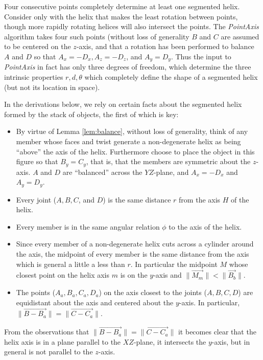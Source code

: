 \documentclass[11pt]{article}
\begin{document}
{Four consecutive points completely determine at least one segmented helix.
Consider
only with the helix that makes the least rotation between points,
though more rapidly rotating helices will also intersect the points.
The {\em PointAxis} algorithm
takes four such points (without loss of generality $B$ and $C$
are assumed to be centered on the $z$-axis, and that a
rotation has been performed to balance $A$ and $D$ so that $A_x = -D_x, A_z = -D_z$, and $A_y = D_y$. Thus the input to
{\em PointAxis} in fact has only three degrees of freedom, which determine the three intrinsic properties $r,d,\theta$
which completely define the shape of a segmented helix (but not its location in space).


In the derivations below, we rely on certain facts about
the segmented helix formed by the stack of objects, the first
of which is key:
\begin{itemize}
\item By virtue of Lemma \ref{lem:balance}, without loss of generality, think of any member whose faces
  and twist generate a non-degenerate helix as being ``above'' the
  axis of the helix. Furthermore choose to place the object in
  this figure so that $B_y = C_y$, that is, that the members are symmetric
  about the $z$-axis.
  $A$ and $D$ are ``balanced'' across the $YZ$-plane,
  and $A_x = -D_x$ and $A_y = D_y$.
\item Every joint ($A,B,C$, and $D$) is the same distance $r$ from the axis $H$ of the helix.
\item Every member is in the same angular relation $\phi$ to the axis of the helix.
\item Since every member of a non-degenerate helix cuts across a cylinder around the axis,
  the midpoint of every member is the same distance from the axis
  which is general a little a less than $r$. In particular the midpoint $M$
  whose closest point on the helix axis $m$ is on the $y$-axis and
  $\| \overrightarrow{M_m} \| < \| \overrightarrow{B_b} \|$.
\item The points ($A_a,B_a,C_a,D_a$) on the axis closest to the joints ($A,B,C,D$)
  are equidistant about the axis and centered about the $y$-axis. In
  particular, $\| \overrightarrow{B - B_a} \| = \| \overrightarrow{C - C_a} \|$.
\end{itemize}

From the observations that $\| \overrightarrow{B - B_a} \| = \| \overrightarrow{C - C_a} \|$
it becomes clear that the helix axis is in a plane
parallel to the $XZ$-plane, it intersects the $y$-axis, but in general is
not parallel to the $z$-axis.

}
\end{document}
